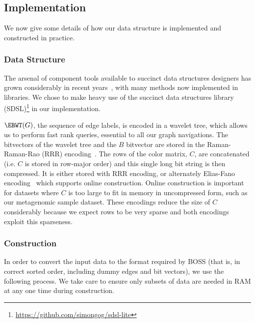 \documentclass[doctor]{thesis}
\begin{document}
\subsection{Implementation}
\label{subsec:implementation}

We now give some details of how our data structure is implemented and constructed in practice.

\subsubsection{Data Structure}

The arsenal of component tools available to succinct data structures designers has grown considerably in recent years~\citep{Navarro16}, with many methods now implemented in libraries. We chose to make heavy use of the succinct data structures library (SDSL)\footnote{\url{https://github.com/simongog/sdsl-lite}} 
in our implementation.

\(\EBWT (G)\), the sequence of edge labels, is encoded in a wavelet tree, which allows us to perform fast rank queries, essential to all our graph navigations. The bitvectors of the wavelet tree  and the $B$ bitvector are stored in the Raman-Raman-Rao (RRR) encoding~\citep{RRR07}.
The rows of the color matrix, $C$, are concatenated (i.e. $C$ is stored in row-major order) and this single long bit string is then compressed.  It is either stored with RRR encoding,  or alternately Elias-Fano encoding~\citep{elias1974efficient,fano1971number,bitvector} which supports online construction.  Online construction is important for datasets where $C$ is too large to fit in memory in uncompressed form, such as our metagenomic sample dataset.  These encodings reduce the size of $C$ considerably because we expect rows to be very sparse
and both encodings exploit this sparseness. 

\subsubsection{Construction}

\makeatletter{}
In order to convert the input data to the format required by BOSS (that is, in correct sorted order, including dummy edges and bit vectors), we use the following process.  We take care to ensure only subsets of data are needed in RAM at any one time during construction.
\end{document}

